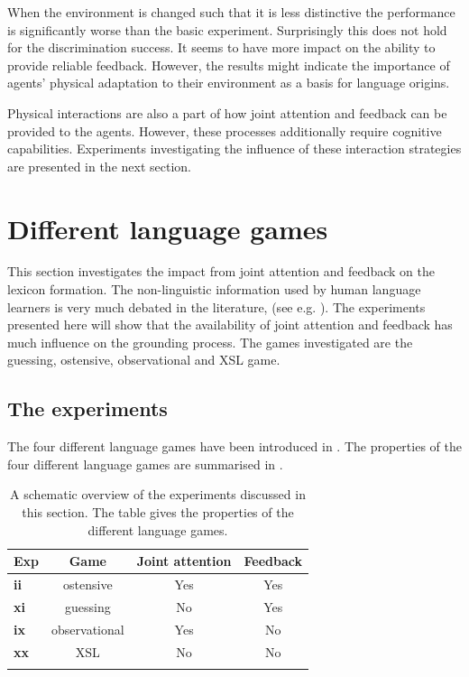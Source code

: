 When the environment is changed such that it is less distinctive the performance is significantly worse than the basic experiment. Surprisingly this does not hold for the discrimination success. It seems to have more impact on the ability to provide reliable feedback. However, the results might indicate the importance of agents' physical adaptation to their environment as a basis for language origins.


Physical interactions are also a part of how joint attention and feedback can be provided to the agents. However, these processes additionally require cognitive capabilities. Experiments investigating the influence of these interaction strategies are presented in the next section.


\section{Different language games}\label{s:par:feed}

This section investigates the impact from joint attention and feedback on the lexicon formation. The non-linguistic information used by human language learners is very much debated in the literature, (see e.g. \citealt{bowerman:1988,barrett:1995}). The experiments presented here will show that the availability of joint attention and feedback has much influence on the grounding process. The games investigated are the guessing, ostensive, observational and XSL game.


\subsection{The experiments}

The four different language games have been introduced in . The properties of the four different language games are summarised in .

\begin{table}[h]
\centering
\begin{tabular}{lccc}
\lsptoprule
Exp & Game & Joint attention & Feedback\\
\midrule
{\bf ii} & ostensive & Yes & Yes\\
{\bf xi} & guessing & No & Yes\\
{\bf ix} & observational & Yes & No\\
{\bf xx} & XSL & No & No\\
\lspbottomrule
\end{tabular}
\caption{A schematic overview of the experiments discussed in this section. The table gives the properties of the different language games.}
\label{t:par:lg}
\end{table}


